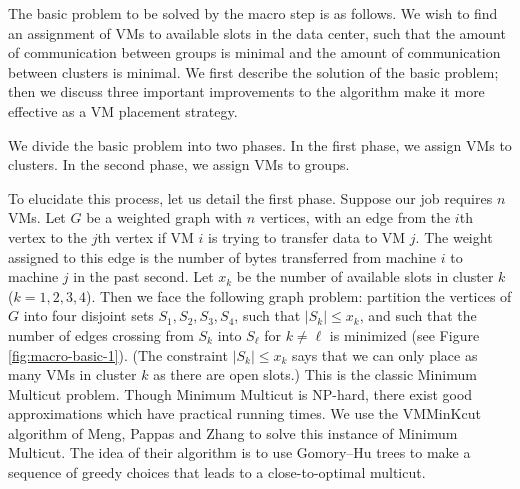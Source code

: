 \documentclass[11pt]{article}
\begin{document}
The basic problem to be solved by the macro step is as follows.  We wish to find an assignment of VMs to available slots in the data center, such that the amount of communication between groups is minimal and the amount of communication between clusters is minimal.  We first describe the solution of the basic problem; then we discuss three important improvements to the algorithm make it more effective as a VM placement strategy.

We divide the basic problem into two phases. In the first phase, we assign VMs to clusters.  In the second phase, we assign VMs to groups.

To elucidate this process, let us detail the first phase.  Suppose our job requires $n$ VMs.  Let $G$ be a weighted graph with $n$ vertices, with an edge from the $i$th vertex to the $j$th vertex if VM $i$ is trying to transfer data to VM $j$.  The weight assigned to this edge is the number of bytes transferred from machine $i$ to machine $j$ in the past second.  Let $x_k$ be the number of available slots in cluster $k$ ($k = 1,2,3,4$).  Then we face the following graph problem: partition the vertices of $G$ into four disjoint sets $S_1,S_2,S_3,S_4$, such that $|S_k| \leq x_k$, and such that the number of edges crossing from $S_k$ into $S_\ell$ for $k \neq \ell$ is minimized (see Figure \ref{fig:macro-basic-1}).  (The constraint $|S_k| \leq x_k$ says that we can only place as many VMs in cluster $k$ as there are open slots.)  This is the classic Minimum Multicut problem.  Though Minimum Multicut is NP-hard, there exist good approximations which have practical running times.  We use the VMMinKcut algorithm of Meng, Pappas and Zhang \cite{Meng} to solve this instance of Minimum Multicut.  The idea of their algorithm is to use Gomory--Hu trees to make a sequence of greedy choices that leads to a close-to-optimal multicut.
\end{document}
